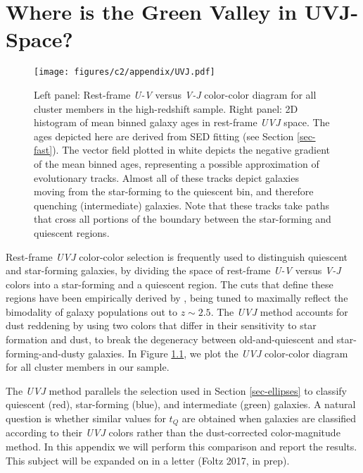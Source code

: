 \chapter{Where is the Green Valley in UVJ-Space?}\label{sec-a-uvj}

\begin{figure}
\centering \texttt{[image: figures/c2/appendix/UVJ.pdf]}
\caption[Mean binned galaxy ages in rest-frame  extit{UVJ} space]{Left panel: Rest-frame \textit{U-V} versus \textit{V-J} color-color diagram for all cluster members in the high-redshift sample.
Right panel: 2D histogram of mean binned galaxy ages in rest-frame \textit{UVJ} space.
The ages depicted here are derived from SED fitting (see Section \ref{sec-fast}).
The vector field plotted in white depicts the negative gradient of the mean binned ages, representing a possible approximation of evolutionary tracks.
Almost all of these tracks depict galaxies moving from the star-forming to the quiescent bin, and therefore quenching (intermediate) galaxies.
Note that these tracks take paths that cross all portions of the boundary between the star-forming and quiescent regions.
\label{fig-a-UVJ}}
\end{figure}

Rest-frame \textit{UVJ} color-color selection is frequently used to distinguish quiescent and star-forming galaxies, by dividing the space of rest-frame \textit{U-V} versus \textit{V-J} colors into a star-forming and a quiescent region.
The cuts that define these regions have been empirically derived by \citet{Williams:2009tt}, being tuned to maximally reflect the bimodality of galaxy populations out to $z\sim2.5$.
The \textit{UVJ} method accounts for dust reddening by using two colors that differ in their sensitivity to star formation and dust, to break the degeneracy between old-and-quiescent and star-forming-and-dusty galaxies.
In Figure \ref{fig-a-UVJ}, we plot the \textit{UVJ} color-color diagram for all cluster members in our sample.

The \textit{UVJ} method parallels the selection used in Section \ref{sec-ellipses} to classify quiescent (red), star-forming (blue), and intermediate (green) galaxies.
A natural question is whether similar values for $t_Q$ are obtained when galaxies are classified according to their \textit{UVJ} colors rather than the dust-corrected color-magnitude method.
In this appendix we will perform this comparison and report the results.
This subject will be expanded on in a letter (Foltz 2017, in prep).

